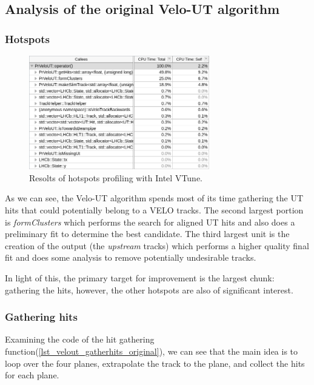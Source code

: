 \documentclass[12pt]{article}
\begin{document}
\subsection{Analysis of the original Velo-UT algorithm}

\subsubsection{Hotspots}

\begin{figure}[H]
	\begin{center}
		\includegraphics[width=0.7\textwidth]{velout_hotspots_orig}
	\end{center}
	\caption{Resolts of hotspots profiling with Intel VTune.}
	\label{fig_velout_hotspots_orig}
\end{figure}

As we can see, the Velo-UT algorithm spends most of its time gathering the UT hits that could potentially belong to a VELO tracks. The second largest portion is \textit{formClusters} which performs the search for aligned UT hits and also does a preliminary fit to determine the best candidate. The third largest unit is the creation of the output (the \textit{upstream} tracks) which performs a higher quality final fit and does some analysis to remove potentially undesirable tracks.

In light of this, the primary target for improvement is the largest chunk: gathering the hits, however, the other hotspots are also of significant interest.


\subsubsection{Gathering hits}

Examining the code of the hit gathering function(\ref{lst_velout_gatherhits_original}), we can see that the main idea is to loop over the four planes, extrapolate the track to the plane, and collect the hits for each plane.
\end{document}

